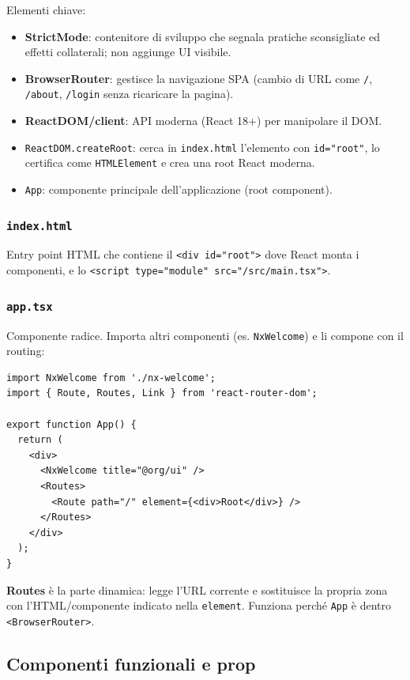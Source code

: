 \documentclass[11pt,a4paper]{article}
\begin{document}
Elementi chiave:
\begin{itemize}[leftmargin=*]
    \item \textbf{StrictMode}: contenitore di sviluppo che segnala pratiche sconsigliate ed effetti collaterali; non aggiunge UI visibile.
    \item \textbf{BrowserRouter}: gestisce la navigazione SPA (cambio di URL come \texttt{/}, \texttt{/about}, \texttt{/login} senza ricaricare la pagina).
    \item \textbf{ReactDOM/client}: API moderna (React 18+) per manipolare il DOM.
    \item \texttt{ReactDOM.createRoot}: cerca in \texttt{index.html} l'elemento con \texttt{id="root"}, lo certifica come \texttt{HTMLElement} e crea una root React moderna.
    \item \texttt{App}: componente principale dell'applicazione (root component).
\end{itemize}

\subsubsection{\texttt{index.html}}
Entry point HTML che contiene il \texttt{<div id="root">} dove React monta i componenti, e lo \texttt{<script type="module" src="/src/main.tsx">}.

\subsubsection{\texttt{app.tsx}}
Componente radice. Importa altri componenti (es. \texttt{NxWelcome}) e li compone con il routing:

\begin{lstlisting}[language=tsx]
import NxWelcome from './nx-welcome';
import { Route, Routes, Link } from 'react-router-dom';

export function App() {
  return (
    <div>
      <NxWelcome title="@org/ui" />
      <Routes>
        <Route path="/" element={<div>Root</div>} />
      </Routes>
    </div>
  );
}
\end{lstlisting}

\textbf{Routes} \`e la parte dinamica: legge l'URL corrente e sostituisce la propria zona con l'HTML/componente indicato nella \texttt{element}. Funziona perch\'e \texttt{App} \`e dentro \texttt{<BrowserRouter>}.

\subsection{Componenti funzionali e prop}
\end{document}
